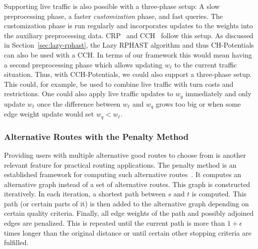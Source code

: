 \documentclass[manuscript,review]{acmart}
\begin{document}
Supporting live traffic is also possible with a three-phase setup:
A slow preprocessing phase, a faster \emph{customization} phase, and fast queries.
The customization phase is run regularly and incorporates updates to the weights into the auxiliary preprocessing data.
CRP~\cite{dgpw-crprn-13} and CCH~\cite{dsw-cch-15} follow this setup.
As discussed in Section~\ref{sec:lazy-rphast}, the Lazy RPHAST algorithm and thus CH-Potentials can also be used with a CCH.
In terms of our framework this would mean having a second preprocessing phase which allows updating $w_\ell$ to the current traffic situation.
Thus, with CCH-Potentials, we could also support a three-phase setup.
This could, for example, be used to combine live traffic with turn costs and restrictions.
One could also apply live traffic updates to $w_q$ immediately and only update $w_\ell$ once the difference between $w_\ell$ and $w_q$ grows too big or when some edge weight update would set $w_q < w_\ell$.

\subsubsection{Alternative Routes with the Penalty Method}

Providing users with multiple alternative good routes to choose from is another relevant feature for practical routing applications.
The penalty method is an established framework for computing such alternative routes~\cite{bdgs-argrn-11,krs-eepma-13,pz-iarp-13,kobitzsch2015alternative}.
It computes an alternative graph instead of a set of alternative routes.
This graph is constructed iteratively.
In each iteration, a shortest path between $s$ and $t$ is computed.
This path (or certain parts of it) is then added to the alternative graph depending on certain quality criteria.
Finally, all edge weights of the path and possibly adjoined edges are penalized.
This is repeated until the current path is more than $1 + \epsilon$ times longer than the original distance or until certain other stopping criteria are fulfilled.
\end{document}
